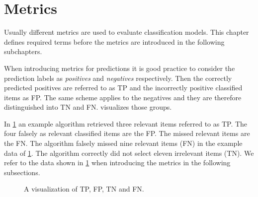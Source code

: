 \section{Metrics}
\label{chp:fundamentals:sec:metrics}

Usually different metrics are used to evaluate classification models.
This chapter defines required terms before the metrics are introduced in the following subchapters.

When introducing metrics for predictions it is good practice to consider the prediction labels as \textit{positives} and \textit{negatives} respectively.
Then the correctly predicted positives are referred to as \ac{TP} and the incorrectly positive classified items as \ac{FP}.
The same scheme applies to the negatives and they are therefore distinguished into \ac{TN} and \ac{FN}.
 visualizes those groups. \parencite{Powers:2011}

In \cref{fig:metrics:tp_vis} an example algorithm retrieved three relevant items referred to as \ac{TP}.
The four falsely as relevant classified items are the \ac{FP}.
The missed relevant items are the \ac{FN}.
The algorithm falsely missed nine relevant items (\ac{FN}) in the example data of \cref{fig:metrics:tp_vis}.
The algorithm correctly did not select eleven irrelevant items (\ac{TN}).
We refer to the data shown in \cref{fig:metrics:tp_vis} when introducing the metrics in the following subsections.
\begin{figure}[htpb]
    \centering
    \def\svgwidth{\columnwidth}
    
    \caption[Visualization of True Positives]{A visualization of \ac{TP}, \ac{FP}, \ac{TN} and \ac{FN}.}\label{fig:metrics:tp_vis}
\end{figure}





